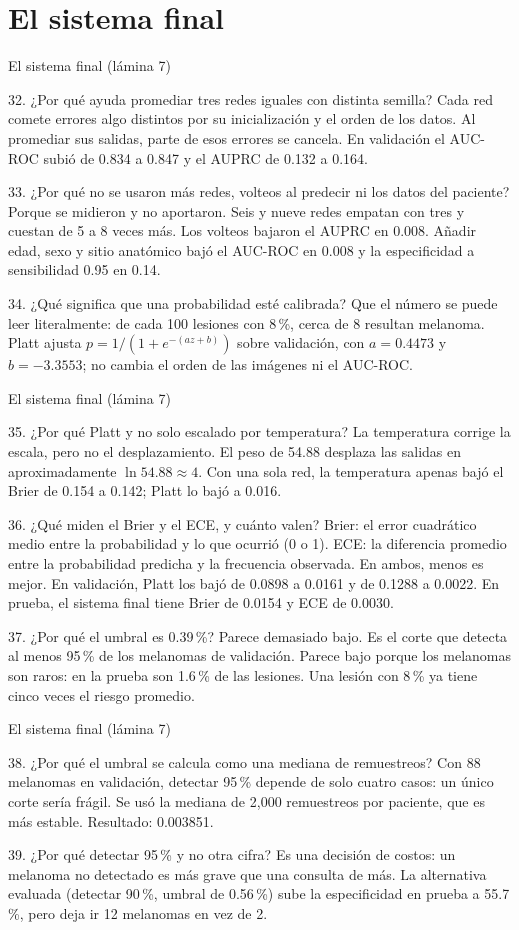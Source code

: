 \documentclass[aspectratio=169,10pt]{beamer}
\newcommand{\qa}[2]{\begin{block}{#1}\footnotesize #2\end{block}}
\begin{document}
\section{El sistema final}
\begin{frame}{El sistema final (lámina 7)}
  \qa{32. ¿Por qué ayuda promediar tres redes iguales con distinta semilla?}{
    Cada red comete errores algo distintos por su inicialización y el orden de los datos. Al promediar sus salidas, parte de esos errores se cancela. En validación el AUC-ROC subió de 0.834 a 0.847 y el AUPRC de 0.132 a 0.164.}
  \qa{33. ¿Por qué no se usaron más redes, volteos al predecir ni los datos del paciente?}{
    Porque se midieron y no aportaron. Seis y nueve redes empatan con tres y cuestan de 5 a 8 veces más. Los volteos bajaron el AUPRC en 0.008. Añadir edad, sexo y sitio anatómico bajó el AUC-ROC en 0.008 y la especificidad a sensibilidad 0.95 en 0.14.}
  \qa{34. ¿Qué significa que una probabilidad esté calibrada?}{
    Que el número se puede leer literalmente: de cada 100 lesiones con 8\,\%, cerca de 8 resultan melanoma. Platt ajusta $p = 1/(1 + e^{-(a z + b)})$ sobre validación, con $a = 0.4473$ y $b = -3.3553$; no cambia el orden de las imágenes ni el AUC-ROC.}
\end{frame}

\begin{frame}{El sistema final (lámina 7)}
  \qa{35. ¿Por qué Platt y no solo escalado por temperatura?}{
    La temperatura corrige la escala, pero no el desplazamiento. El peso de 54.88 desplaza las salidas en aproximadamente $\ln 54.88 \approx 4$. Con una sola red, la temperatura apenas bajó el Brier de 0.154 a 0.142; Platt lo bajó a 0.016.}
  \qa{36. ¿Qué miden el Brier y el ECE, y cuánto valen?}{
    Brier: el error cuadrático medio entre la probabilidad y lo que ocurrió (0 o 1). ECE: la diferencia promedio entre la probabilidad predicha y la frecuencia observada. En ambos, menos es mejor. En validación, Platt los bajó de 0.0898 a 0.0161 y de 0.1288 a 0.0022. En prueba, el sistema final tiene Brier de 0.0154 y ECE de 0.0030.}
  \qa{37. ¿Por qué el umbral es 0.39\,\%? Parece demasiado bajo.}{
    Es el corte que detecta al menos 95\,\% de los melanomas de validación. Parece bajo porque los melanomas son raros: en la prueba son 1.6\,\% de las lesiones. Una lesión con 8\,\% ya tiene cinco veces el riesgo promedio.}
\end{frame}

\begin{frame}{El sistema final (lámina 7)}
  \qa{38. ¿Por qué el umbral se calcula como una mediana de remuestreos?}{
    Con 88 melanomas en validación, detectar 95\,\% depende de solo cuatro casos: un único corte sería frágil. Se usó la mediana de 2,000 remuestreos por paciente, que es más estable. Resultado: 0.003851.}
  \qa{39. ¿Por qué detectar 95\,\% y no otra cifra?}{
    Es una decisión de costos: un melanoma no detectado es más grave que una consulta de más. La alternativa evaluada (detectar 90\,\%, umbral de 0.56\,\%) sube la especificidad en prueba a 55.7\,\%, pero deja ir 12 melanomas en vez de 2.}
\end{frame}
\end{document}
